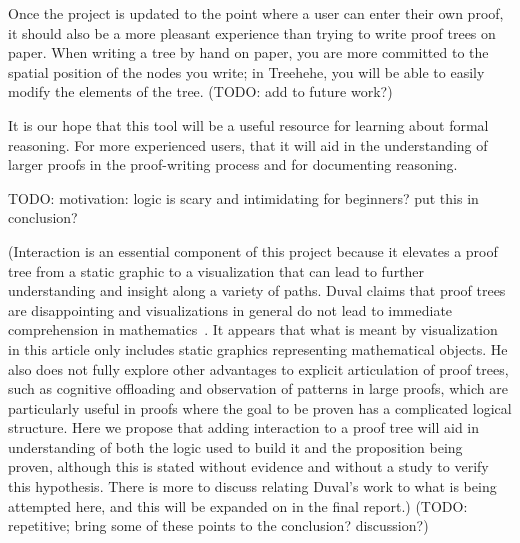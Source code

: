 \documentclass[conference]{IEEEtran}
\newcommand{\projectname}{Treehehe}
\begin{document}
Once the project is updated to the point where a user can enter their own proof, it should also be a more pleasant experience than trying to write proof trees on paper. When writing a tree by hand on paper, you are more committed to the spatial position of the nodes you write; in \projectname{}, you will be able to easily modify the elements of the tree. (TODO: add to future work?)

It is our hope that this tool will be a useful resource for learning about formal reasoning. For more experienced users, that it will aid in the understanding of larger proofs in the proof-writing process and for documenting reasoning.


TODO: motivation: logic is scary and intimidating for beginners? put this in conclusion?



(Interaction is an essential component of this project because it elevates a proof tree from a static graphic to a visualization that can lead to further understanding and insight along a variety of paths. Duval claims that proof trees are disappointing and visualizations in general do not lead to immediate comprehension in mathematics~\cite{repvisvis-duval}. It appears that what is meant by visualization in this article only includes static graphics representing mathematical objects. He also does not fully explore other advantages to explicit articulation of proof trees, such as cognitive offloading and observation of patterns in large proofs, which are particularly useful in proofs where the goal to be proven has a complicated logical structure. Here we propose that adding interaction to a proof tree will aid in understanding of both the logic used to build it and the proposition being proven, although this is stated without evidence and without a study to verify this hypothesis. There is more to discuss relating Duval’s work to what is being attempted here, and this will be expanded on in the final report.) (TODO: repetitive; bring some of these points to the conclusion? discussion?)

%
\end{document}
